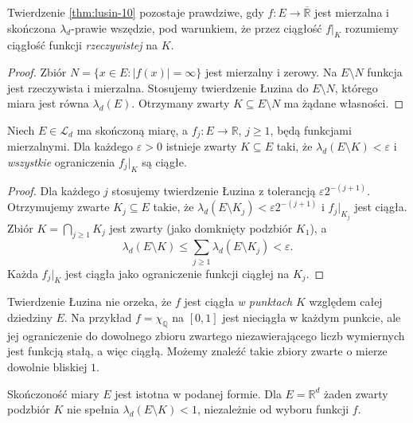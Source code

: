 \begin{wniosek}
\label{cor:lusin-finite-ae-10}
Twierdzenie \ref{thm:lusin-10} pozostaje prawdziwe,
gdy $f:E\to\overline{\mathbb R}$ jest mierzalna i
skończona $\lambda_d$-prawie wszędzie, pod warunkiem,
że przez ciągłość $f|_K$ rozumiemy ciągłość
funkcji \emph{rzeczywistej} na $K$.
\end{wniosek}
\begin{proof}
Zbiór $N=\{x\in E:|f(x)|=\infty\}$ jest
mierzalny i zerowy. Na $E\setminus N$ funkcja
jest rzeczywista i mierzalna. Stosujemy twierdzenie
Łuzina do $E\setminus N$, którego miara jest
równa $\lambda_d(E)$. Otrzymany zwarty
$K\subseteq E\setminus N$ ma żądane własności.
\end{proof}

\begin{wniosek}
\label{cor:countable-lusin-10}
Niech $E\in\mathcal L_d$ ma skończoną miarę,
a $f_j:E\to\mathbb R$, $j\ge1$, będą
funkcjami mierzalnymi. Dla każdego $\varepsilon>0$
istnieje zwarty $K\subseteq E$ taki, że
$\lambda_d(E\setminus K)<\varepsilon$ i
\emph{wszystkie} ograniczenia $f_j|_K$ są ciągłe.
\end{wniosek}
\begin{proof}
Dla każdego $j$ stosujemy twierdzenie Łuzina
z tolerancją $\varepsilon2^{-(j+1)}$.
Otrzymujemy zwarte $K_j\subseteq E$ takie,
że $\lambda_d(E\setminus K_j)<\varepsilon2^{-(j+1)}$
i $f_j|_{K_j}$ jest ciągła.
Zbiór $K=\bigcap_{j\ge1}K_j$ jest zwarty
(jako domknięty podzbiór $K_1$), a
\[
\lambda_d(E\setminus K)
\le\sum_{j\ge1}\lambda_d(E\setminus K_j)
<\varepsilon.
\]
Każda $f_j|_K$ jest ciągła jako ograniczenie
funkcji ciągłej na $K_j$.
\end{proof}

\begin{uwaga}
\label{rem:lusin-limitations-10}
Twierdzenie Łuzina nie orzeka, że $f$ jest
ciągła \emph{w punktach} $K$ względem całej
dziedziny $E$. Na przykład $f=\chi_{\mathbb Q}$
na $[0,1]$ jest nieciągła w każdym punkcie, ale
jej ograniczenie do dowolnego zbioru zwartego
niezawierającego liczb wymiernych jest funkcją
stałą, a więc ciągłą. Możemy znaleźć takie
zbiory zwarte o mierze dowolnie bliskiej $1$.

Skończoność miary $E$ jest istotna w podanej formie.
Dla $E=\mathbb R^d$ żaden zwarty podzbiór $K$
nie spełnia $\lambda_d(E\setminus K)<1$,
niezależnie od wyboru funkcji $f$.
\end{uwaga}

